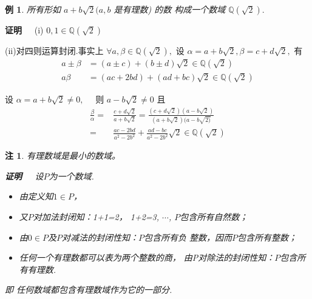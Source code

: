 \documentclass[13pt,fontset=mac]{ctexbeamer}
\newtheorem{exa}{例}
\newtheorem*{rem}{注}
\def\pf{{\bf 证明~~ }}
\def\a{\alpha}
\begin{document}
\begin{frame}
\begin{exa}
所有形如 $a+b \sqrt{2}(a ,b$ 是有理数) 的数 构成一个数域 $\mathbb{Q}(\sqrt{2}) .$
\end{exa}

\pause
\pf (i) $0,1 \in \mathbb{Q}(\sqrt{2})$


(ii)对四则运算封闭.事实上 $\forall a, \beta \in \mathbb{Q}(\sqrt{2}),$ 设 $\a=a+b \sqrt{2}, \beta=c+d \sqrt{2},$ 有
\begin{align*}
a \pm \beta & =(a \pm c)+(b \pm d) \sqrt{2} \in \mathbb{Q}(\sqrt{2})\\[6pt]
a \beta & =(a c+2 b d)+(a d+b c) \sqrt{2} \in \mathbb{Q}(\sqrt{2})
\end{align*}

设 $\a=a+b \sqrt{2} \neq 0, \quad$ 则 $a-b \sqrt{2} \neq 0$ 且
\begin{align*}
\frac{\beta}{\a}= & \frac{c+d \sqrt{2}}{a+b \sqrt{2}}=\frac{(c+d \sqrt{2})(a-b \sqrt{2})}{(a+b \sqrt{2})(a-b \sqrt{2)}}\\[6pt]
= & \frac{a c-2 b d}{a^{2}-2 b^{2}}+\frac{a d-b c}{a^{2}-2 b^{2}} \sqrt{2} \in \mathbb{Q}(\sqrt{2})
\end{align*}

\end{frame}

\begin{frame}
\begin{rem}
有理数域是最小的数域。


\pf
设$P$为一个数域.
\begin{itemize}
    \item 由定义知$1\in P$，
    \item 又$P$对加法封闭知：1+1=2，
1+2=3, $\cdots$,  $P$包含所有\alert{自然数}；
	\item 由$0\in P$及$P$对减法的封闭性知：$P$包含所有负
整数，因而$P$包含所有\alert{整数}；
\item
任何一个有理数都可以表为两个整数的商，
由P对除法的封闭性知：$P$包含所有\alert{有理数}.

\end{itemize}

即
    任何数域都包含有理数域作为它的一部分.

\end{rem}

\end{frame}
\end{document}
